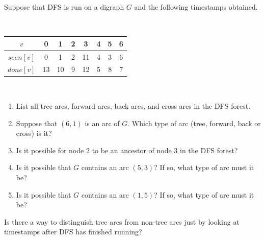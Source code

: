 \begin{Exercise}[2002 midterm]
\label{ex:DFS-timestamps}
\item Suppose that DFS is run on a digraph $G$ and the following
timestamps obtained.

\

\begin{tabular}{|c|ccccccc|}
\hline 
$v$ & 0 & 1 & 2 & 3 & 4 & 5 & 6 \\
\hline
$seen[v]$ & 0 & 1 & 2 & 11 & 4 & 3 & 6 \\
\hline
$done[v]$ & 13 & 10 & 9 & 12 & 5 & 8 & 7 \\
\hline
\end{tabular}

\

\begin{enumerate}
\romenumi


\item List all tree arcs, forward arcs, back arcs, and cross arcs in the
DFS forest.

\item 
Suppose that $(6,1)$ is an arc of $G$. Which type of arc 
(tree, forward, back or cross) is it?


\item 
Is it possible for node $2$ to be an ancestor of node $3$ in the DFS
forest?

\item
Is it possible that $G$ contains an arc $(5,3)$? If so, what type of arc
must it be?

\item 
Is it possible that $G$ contains an arc $(1,5)$? If so, what type of arc
must it be?

\end{enumerate}


\end{Exercise}

\begin{Exercise}
\label{ex:DFS-tree-vs-nontree}
Is there a way to distinguish tree arcs from non-tree arcs just by
looking at timestamps after DFS has finished running?
\end{Exercise}



